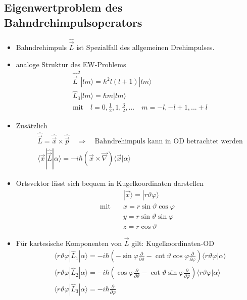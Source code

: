\documentclass[10pt,article,colorback,accentcolor=tud9d]{scrartcl}
\begin{document}
\subsection{Eigenwertproblem des Bahndrehimpulsoperators}
\begin{itemize}
	\item Bahndrehimpuls $\hat{\vec{L}}$ ist Spezialfall des allgemeinen Drehimpulses.
  \item analoge Struktur des EW-Problems
    \begin{align}
    &\hat{\vec{L}}^2|lm\rangle=\hbar^2l(l+1)|lm\rangle\\
    &\hat{L}_3|lm\rangle=\hbar m|lm\rangle\\
    &\text{mit}\quad l=0,\frac{1}{2},1,\frac{3}{2},...\quad m=-l,-l+1,...+l\nonumber
    \end{align}
  \item Zusätzlich
    \begin{align}
    &\hat{\vec{L}}=\hat{\vec{x}}\times\hat{\vec{p}}\quad\Rightarrow\quad\text{Bahndrehimpuls kann in OD betrachtet werden}\\
    &\langle\vec{x}|\hat{\vec{L}}|\alpha\rangle=-i\hbar(\vec{x}\times\vec{\nabla})\langle\vec{x}|\alpha\rangle
    \end{align}
  \item Ortsvektor lässt sich bequem in Kugelkoordinaten darstellen
    \begin{align}
    &|\vec{x}\rangle=|r\vartheta\varphi\rangle\\
    \text{mit}\quad&x=r\sin\vartheta\cos\varphi\\
    &y=r\sin\vartheta\sin\varphi\\
    &z=r\cos\vartheta
    \end{align}
  \item Für kartesische Komponenten von $\vec{L}$ gilt: Kugelkoordinaten-OD
    \begin{align}
    &\langle r\vartheta\varphi|\hat{L}_1|\alpha\rangle=-i\hbar\left(-\sin\varphi\frac{\partial}{\partial\vartheta}-\cot\vartheta\cos\varphi\frac{\partial}{\partial\varphi}\right)\langle r\vartheta\varphi|\alpha\rangle\\
    &\langle r\vartheta\varphi|\hat{L}_2|\alpha\rangle=-i\hbar\left(\cos\varphi\frac{\partial}{\partial\vartheta}-\cot\vartheta\sin\varphi\frac{\partial}{\partial\varphi}\right)\langle r\vartheta\varphi|\alpha\rangle\\
    &\langle r\vartheta\varphi|\hat{L}_3|\alpha\rangle=-i\hbar\frac{\partial}{\partial\varphi}\\

\end{align}
\end{itemize}
\end{document}
